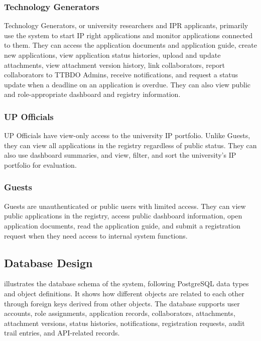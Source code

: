 \subsubsection{Technology Generators}

Technology Generators, or university researchers and IPR applicants, primarily use the system to start IP right applications and monitor applications connected to them. They can access the application documents and application guide, create new applications, view application status histories, upload and update attachments, view attachment version history, link collaborators, report collaborators to TTBDO Admins, receive notifications, and request a status update when a deadline on an application is overdue. They can also view public and role-appropriate dashboard and registry information.

\subsubsection{UP Officials}

UP Officials have view-only access to the university IP portfolio. Unlike Guests, they can view all applications in the registry regardless of public status. They can also use dashboard summaries, and view, filter, and sort the university's IP portfolio for evaluation.

\subsubsection{Guests}

Guests are unauthenticated or public users with limited access. They can view public applications in the registry, access public dashboard information, open application documents, read the application guide, and submit a registration request when they need access to internal system functions.

\subsection{Database Design}

 illustrates the database schema of the system, following PostgreSQL data types and object definitions. It shows how different objects are related to each other through foreign keys derived from other objects. The database supports user accounts, role assignments, application records, collaborators, attachments, attachment versions, status histories, notifications, registration requests, audit trail entries, and API-related records.

